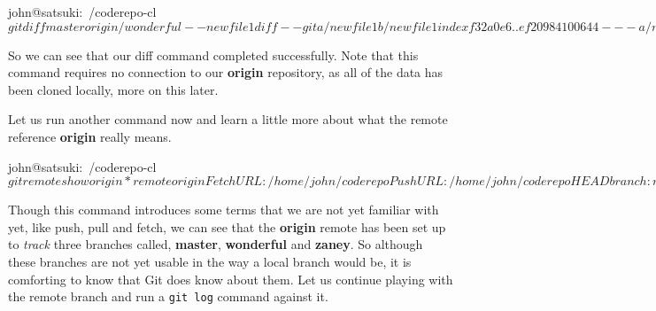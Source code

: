 \begin{code}
john@satsuki:~/coderepo-cl$ git diff master origin/wonderful -- newfile1
diff --git a/newfile1 b/newfile1
index f32a0e6..ef20984 100644
--- a/newfile1
+++ b/newfile1
@@ -1,3 +1,2 @@
 A new file
-and some more awesome changes
-Some mega important changes
+and some more changes
john@satsuki:~/coderepo-cl$
\end{code}

So we can see that our diff command completed successfully.
Note that this command requires no connection to our \textbf{origin} repository, as all of the data has been cloned locally, more on this later.

Let us run another command now and learn a little more about what the remote reference \textbf{origin} really means.

\begin{code}
john@satsuki:~/coderepo-cl$ git remote show origin
* remote origin
  Fetch URL: /home/john/coderepo
  Push  URL: /home/john/coderepo
  HEAD branch: master
  Remote branches:
    master    tracked
    wonderful tracked
    zaney     tracked
  Local branch configured for 'git pull':
    master merges with remote master
  Local ref configured for 'git push':
    master pushes to master (up to date)
john@satsuki:~/coderepo-cl$
\end{code}

Though this command introduces some terms that we are not yet familiar with yet, like push, pull and fetch, we can see that the \textbf{origin} remote has been set up to \emph{track} three branches called, \textbf{master}, \textbf{wonderful} and \textbf{zaney}.
So although these branches are not yet usable in the way a local branch would be, it is comforting to know that Git does know about them.
Let us continue playing with the remote branch and run a \texttt{git log} command against it.


